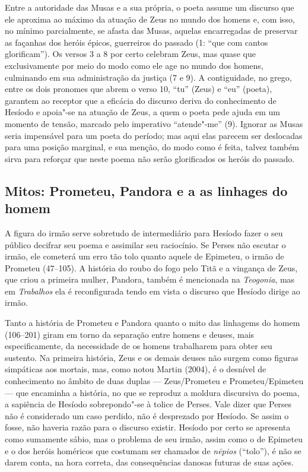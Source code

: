 Entre a autoridade das Musas e a sua própria, o poeta assume um discurso
que ele aproxima ao máximo da atuação de Zeus no mundo dos homens e, com
isso, no mínimo parcialmente, se afasta das Musas, aquelas encarregadas
de preservar as façanhas dos heróis épicos, guerreiros do passado (1:
``que com cantos glorificam''). Os versos 3 a 8 por certo celebram Zeus,
mas quase que exclusivamente por meio do modo como ele age no mundo dos
homens, culminando em sua administração da justiça (7 e 9). A
contiguidade, no grego, entre os dois pronomes que abrem o verso 10,
``tu'' (Zeus) e ``eu'' (poeta), garantem ao receptor que a eficácia do
discurso deriva do conhecimento de Hesíodo e apoia"-se na atuação de
Zeus, a quem o poeta pede ajuda em um momento de tensão, marcado pelo
imperativo ``atende"-me'' (9). Ignorar as Musas seria impensável para um
poeta do período; mas aqui elas parecem ser deslocadas para uma posição
marginal, e sua menção, do modo como é feita, talvez também sirva para
reforçar que neste poema não serão glorificados os heróis do passado.


\subsection{Mitos: Prometeu, Pandora e a as linhages do homem}

A figura do irmão serve sobretudo de intermediário para Hesíodo
fazer o seu público decifrar seu poema e assimilar seu raciocínio. Se
Perses não escutar o irmão, ele cometerá um erro tão tolo quanto aquele
de Epimeteu, o irmão de Prometeu (47--105). A história do roubo do fogo
pelo Titã e a vingança de Zeus, que criou a primeira mulher, Pandora,
também é mencionada na \emph{Teogonia}, mas em \emph{Trabalhos} ela é
reconfigurada tendo em vista o discurso que Hesíodo dirige ao irmão.

Tanto a história de Prometeu e Pandora quanto o mito das linhagems do
homem (106--201) giram em torno da separação entre homens e deuses, mais
especificamente, da necessidade de os homens trabalharem para obter seu
sustento. Na primeira história, Zeus e os demais deuses não surgem como
figuras simpáticas aos mortais, mas, como notou Martin (2004), é o
desnível de conhecimento no âmbito de duas duplas --- Zeus/Prometeu e
Prometeu/Epimeteu --- que encaminha a história, no que se reproduz a
moldura discursiva do poema, a sapiência de Hesíodo sobrepondo"-se à
tolice de Perses. Vale dizer que Perses não é considerado um caso
perdido, não é desprezado por Hesíodo. Se assim o fosse, não haveria
razão para o discurso existir. Hesíodo por certo se apresenta como
sumamente sábio, mas o problema de seu irmão, assim como o de Epimeteu e
o dos heróis homéricos que costumam ser chamados de \emph{nēpios}
(``tolo''), é não se darem conta, na hora correta, das consequências
danosas futuras de suas ações.

